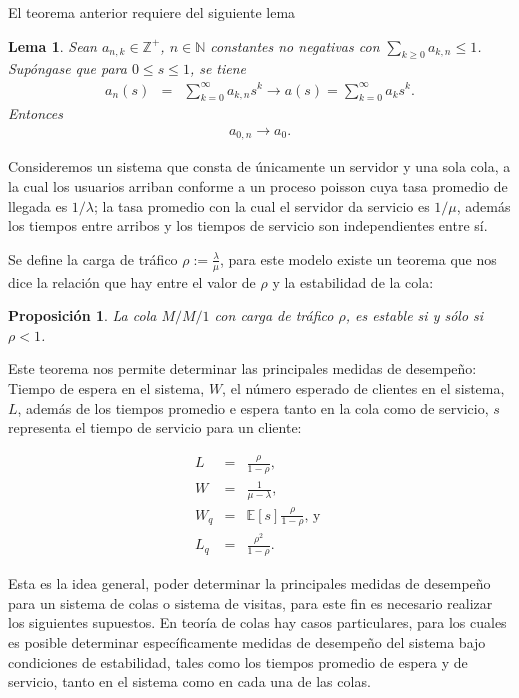 \documentclass{article}
\newtheorem{Prop}{Proposición}
\newtheorem{Lemma}{Lema}
\newcommand{\nat}{\mathbb{N}}
\newcommand{\ent}{\mathbb{Z}}
\newcommand{\esp}{\mathbb{E}}
\begin{document}
El teorema anterior requiere del siguiente lema

\begin{Lemma}
Sean $a_{n,k}\in\ent^{+}$, $n\in\nat$ constantes no negativas con
$\sum_{k\geq0}a_{k,n}\leq1$. Sup\'ongase que para $0\leq s\leq1$,
se tiene
\begin{eqnarray*}
a_{n}\left(s\right)&=&\sum_{k=0}^{\infty}a_{k,n}s^{k}\rightarrow
a\left(s\right)=\sum_{k=0}^{\infty}a_{k}s^{k}.
\end{eqnarray*}
Entonces
\begin{eqnarray*}
a_{0,n}\rightarrow a_{0}.
\end{eqnarray*}
\end{Lemma}

Consideremos un sistema que consta de \'unicamente un servidor y una sola cola, a la cual los usuarios arriban conforme a un proceso poisson cuya tasa promedio de llegada es $1/\lambda$; la tasa promedio con la cual el servidor da servicio es $1/\mu$, adem\'as los tiempos entre arribos y los tiempos de servicio son independientes entre s\'i.

Se define la carga de tr\'afico $\rho:=\frac{\lambda}{\mu}$, para este modelo existe un teorema que nos dice la relaci\'on que hay entre el valor de $\rho$ y la estabilidad de la cola:

\begin{Prop}
La cola $M/M/1$ con carga de tr\'afico $\rho$, es estable si y s\'olo si $\rho<1$.
\end{Prop}

Este teorema nos permite determinar las principales medidas de desempe\~no: Tiempo de espera en el sistema, $W$, el n\'umero esperado de clientes en el sistema, $L$, adem\'as de los tiempos promedio e espera tanto en la cola como de servicio, $s$ representa el tiempo de servicio para un cliente:

\begin{eqnarray}
 L&=&\frac{\rho}{1-\rho},\\
W&=&\frac{1}{\mu-\lambda},\\
W_{q}&=&\esp\left[s\right]\frac{\rho}{1-\rho}\textrm{,  y }\\
L_{q}&=&\frac{\rho^{2}}{1-\rho}.
\end{eqnarray}

Esta es la idea general, poder determinar la principales medidas de desempe\~no para un sistema de colas o sistema de visitas, para este fin es necesario realizar los siguientes supuestos. En teor\'ia de colas hay casos particulares, para los cuales es posible determinar espec\'ificamente medidas de desempe\~no del sistema bajo condiciones de estabilidad, tales como los tiempos promedio de espera y de servicio, tanto en el sistema como en cada
una de las colas.
\end{document}
